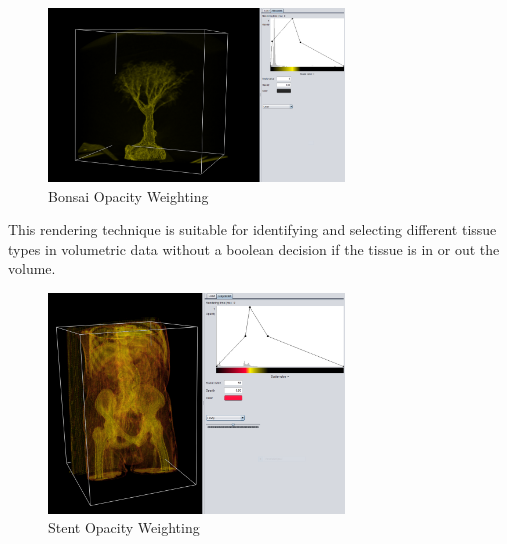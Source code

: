 \documentclass[a4paper,twoside,11pt]{article}
\begin{document}
\begin{figure}[h!]
\begin{center}
    \includegraphics[width=0.7\textwidth]{Images/BonsaiOW.png}
    \caption{Bonsai Opacity Weighting}
    \label{fig:OrangeOW}
\end{center}
\end{figure}
This rendering technique is suitable for identifying and selecting different tissue types in volumetric data without a boolean decision if the tissue is in or out the volume.
\begin{figure}[h!]
\begin{center}
    \includegraphics[width=0.7\textwidth]{Images/StentOW.png}
    \caption{Stent Opacity Weighting}
    \label{fig:StentOW}
\end{center}
\end{figure}
\newpage
\end{document}
